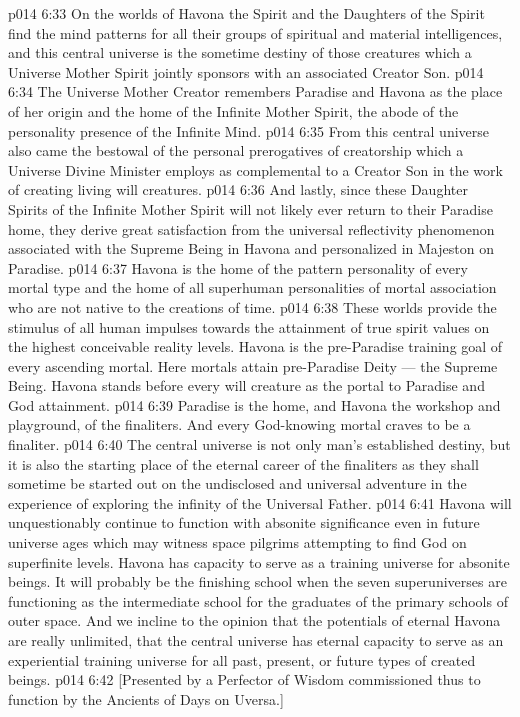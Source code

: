 \vs p014 6:33 On the worlds of Havona the Spirit and the Daughters of the Spirit find the mind patterns for all their groups of spiritual and material intelligences, and this central universe is the sometime destiny of those creatures which a Universe Mother Spirit jointly sponsors with an associated Creator Son.
\vs p014 6:34 The Universe Mother Creator remembers Paradise and Havona as the place of her origin and the home of the Infinite Mother Spirit, the abode of the personality presence of the Infinite Mind.
\vs p014 6:35 From this central universe also came the bestowal of the personal prerogatives of creatorship which a Universe Divine Minister employs as complemental to a Creator Son in the work of creating living will creatures.
\vs p014 6:36 And lastly, since these Daughter Spirits of the Infinite Mother Spirit will not likely ever return to their Paradise home, they derive great satisfaction from the universal reflectivity phenomenon associated with the Supreme Being in Havona and personalized in Majeston on Paradise.
\vs p014 6:37 \pc {}\bibnobreakspace {} Havona is the home of the pattern personality of every mortal type and the home of all superhuman personalities of mortal association who are not native to the creations of time.
\vs p014 6:38 These worlds provide the stimulus of all human impulses towards the attainment of true spirit values on the highest conceivable reality levels. Havona is the pre\hyp{}Paradise training goal of every ascending mortal. Here mortals attain pre\hyp{}Paradise Deity --- the Supreme Being. Havona stands before every will creature as the portal to Paradise and God attainment.
\vs p014 6:39 Paradise is the home, and Havona the workshop and playground, of the finaliters. And every God\hyp{}knowing mortal craves to be a finaliter.
\vs p014 6:40 The central universe is not only man’s established destiny, but it is also the starting place of the eternal career of the finaliters as they shall sometime be started out on the undisclosed and universal adventure in the experience of exploring the infinity of the Universal Father.
\vs p014 6:41 \pc Havona will unquestionably continue to function with absonite significance even in future universe ages which may witness space pilgrims attempting to find God on superfinite levels. Havona has capacity to serve as a training universe for absonite beings. It will probably be the finishing school when the seven superuniverses are functioning as the intermediate school for the graduates of the primary schools of outer space. And we incline to the opinion that the potentials of eternal Havona are really unlimited, that the central universe has eternal capacity to serve as an experiential training universe for all past, present, or future types of created beings.
\vsetoff
\vs p014 6:42 [Presented by a Perfector of Wisdom commissioned thus to function by the Ancients of Days on Uversa.]
